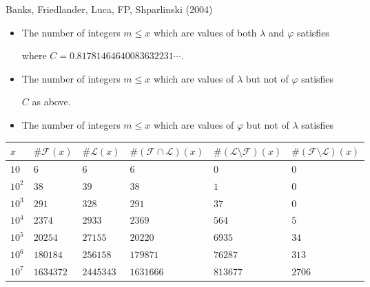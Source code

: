 \documentclass[landscape]{powersem} %
\newcommand{\matitablu}{\textcolor{MidnightBlue}{\ding{46}}}
\newcommand{\heading}[1]{%
 \begin{center}
  \large\bf
  \shadowbox{{\textcolor{conceptcolor}{#1}}}%
 \end{center}
 \vspace{1ex minus 1ex}}
\begin{document}
\begin{slide}
\heading{Image of $\varphi$ vs image of $\lambda$}\pause

\textcolor{OliveGreen}{Banks, Friedlander, Luca, F\!\!P, Shparlinski} (2004)\pause

\begin{itemize}

\item[\matitablu]
The number of integers $m\leq x$ which are values of both $\lambda$
and $\varphi$ satisfies\pause\medskip
 \centerline{}\pause
where $C=0.81781464640083632231\cdots$.
\pause\medskip

\item[\matitablu] The number of integers $m\le x$ which are values of $\lambda$ but
not of $\varphi$ satisfies\medskip\pause
 \centerline{}\pause
 $C$ as above.\pause

\item[\matitablu] The number of integers $m\le x$ which are values of $\varphi$
but not of $\lambda$ satisfies\medskip\pause
 \centerline{}
\end{itemize}
\end{slide}

\begin{slide}
\heading{Image of $\varphi$ vs image of $\lambda$ - Numerical Examples\qquad (1/2)}\pause

\begin{center}
\begin{tabular}{|l|l|l|l|l|l|}
\hline
      $x$& $\#\mathcal F(x)$ & $\#\mathcal L(x)$ & $\#(\mathcal F\cap\mathcal L)(x)$&
$\#(\mathcal L\setminus\mathcal F)(x)$&$\#(\mathcal F\setminus\mathcal L)(x)$\\
\hline
$10$ & $6$ & $6$ & $6$ & $0$ & $0$\\
$10^2$ & $38$ & $39$ & $38$ & $1$ & $0$\\
$10^3$ & $291$ & $328$ & $291$ & $37$ & $0$\\
$10^4$ & $2374$ & $2933$ & $2369$ & $564$ & $5$\\
$10^5$ & $20254$ & $27155$ & $20220$ & $6935$ & $34$\\
$10^6$ & $180184$ & $256158$ & $179871$ & $76287$ & $313$\\
$10^7$ & $1634372$ & $2445343$&$1631666$&$813677$ & $ 2706$ \\
\hline
\end{tabular}\pause\bigskip

\end{center}
\end{slide}
\end{document}
